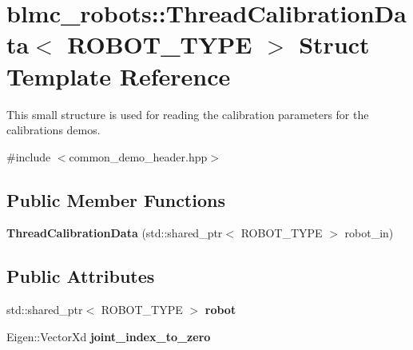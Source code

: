 \hypertarget{structblmc__robots_1_1ThreadCalibrationData}{}\section{blmc\+\_\+robots\+:\+:Thread\+Calibration\+Data$<$ R\+O\+B\+O\+T\+\_\+\+T\+Y\+PE $>$ Struct Template Reference}
\label{structblmc__robots_1_1ThreadCalibrationData}


This small structure is used for reading the calibration parameters for the calibrations demos.  




{\ttfamily \#include $<$common\+\_\+demo\+\_\+header.\+hpp$>$}

\subsection*{Public Member Functions}
\begin{DoxyCompactItemize}
\item 
{\bfseries Thread\+Calibration\+Data} (std\+::shared\+\_\+ptr$<$ R\+O\+B\+O\+T\+\_\+\+T\+Y\+PE $>$ robot\+\_\+in)\hypertarget{structblmc__robots_1_1ThreadCalibrationData_a3529e99623e721c298aaf130e5f5c532}{}\label{structblmc__robots_1_1ThreadCalibrationData_a3529e99623e721c298aaf130e5f5c532}

\end{DoxyCompactItemize}
\subsection*{Public Attributes}
\begin{DoxyCompactItemize}
\item 
std\+::shared\+\_\+ptr$<$ R\+O\+B\+O\+T\+\_\+\+T\+Y\+PE $>$ {\bfseries robot}\hypertarget{structblmc__robots_1_1ThreadCalibrationData_ad2ab54755b5ab44f04deeea643d65c75}{}\label{structblmc__robots_1_1ThreadCalibrationData_ad2ab54755b5ab44f04deeea643d65c75}

\item 
Eigen\+::\+Vector\+Xd {\bfseries joint\+\_\+index\+\_\+to\+\_\+zero}\hypertarget{structblmc__robots_1_1ThreadCalibrationData_ac76287dbb3e693f78b4ea68e6164feb7}{}\label{structblmc__robots_1_1ThreadCalibrationData_ac76287dbb3e693f78b4ea68e6164feb7}

\end{DoxyCompactItemize}


